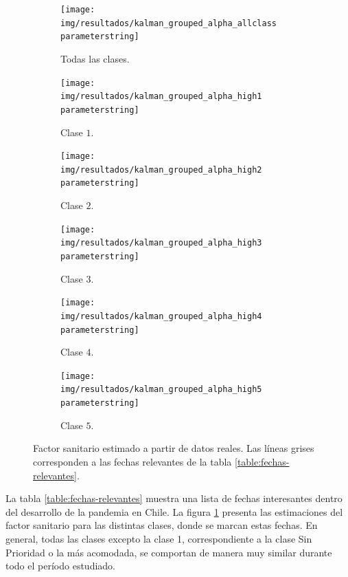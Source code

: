 \begin{figure}[H]
     \centering
     \begin{subfigure}[b]{.99\textwidth}
         \centering
         \texttt{[image: img/resultados/kalman\_grouped\_alpha\_allclass\\parameterstring]}
         \caption{Todas las clases.}
     \end{subfigure}
     \hfill
     \begin{subfigure}[b]{0.47\textwidth}
         \centering
         \texttt{[image: img/resultados/kalman\_grouped\_alpha\_high1\\parameterstring]}
         \caption{Clase \(1\).}
     \end{subfigure}
     \hfill
     \begin{subfigure}[b]{.47\textwidth}
         \centering
         \texttt{[image: img/resultados/kalman\_grouped\_alpha\_high2\\parameterstring]}
         \caption{Clase \(2\).}
     \end{subfigure}
     \hfill
     \begin{subfigure}[b]{.47\textwidth}
         \centering
         \texttt{[image: img/resultados/kalman\_grouped\_alpha\_high3\\parameterstring]}
         \caption{Clase \(3\).}
     \end{subfigure}
     \hfill
     \begin{subfigure}[b]{.47\textwidth}
         \centering
         \texttt{[image: img/resultados/kalman\_grouped\_alpha\_high4\\parameterstring]}
         \caption{Clase \(4\).}
     \end{subfigure}
     \hfill
     \begin{subfigure}[b]{.47\textwidth}
         \centering
         \texttt{[image: img/resultados/kalman\_grouped\_alpha\_high5\\parameterstring]}
         \caption{Clase \(5\).}
     \end{subfigure}
        \caption[Factor sanitario estimado a partir de datos reales.]{Factor sanitario estimado a partir de datos reales. Las líneas grises corresponden a las fechas relevantes de la tabla \ref{table:fechas-relevantes}.}
        \label{alpha-comp-high}
\end{figure}


La tabla \ref{table:fechas-relevantes} muestra una lista de fechas interesantes dentro del desarrollo de la pandemia en Chile. La figura \ref{alpha-comp-high} presenta las estimaciones del factor sanitario para las distintas clases, donde se marcan estas fechas. En general, todas las clases excepto la clase 1, correspondiente a la clase Sin Prioridad o la más acomodada, se comportan de manera muy similar durante todo el período estudiado.

